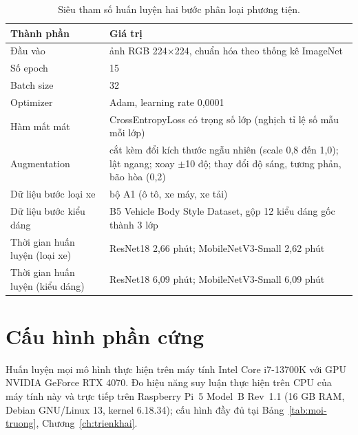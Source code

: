 \begin{table}[htbp]
\centering
\caption{Siêu tham số huấn luyện hai bước phân loại phương tiện.}
\label{tab:app-cls}

\vspace{4pt}
\begin{tabular}{@{}p{4.5cm}p{9cm}@{}}
\toprule
\textbf{Thành phần} & \textbf{Giá trị} \\
\midrule
Đầu vào & ảnh RGB 224$\times$224, chuẩn hóa theo thống kê ImageNet \\
Số epoch & 15 \\
Batch size & 32 \\
Optimizer & Adam, learning rate 0,0001 \\
Hàm mất mát & CrossEntropyLoss có trọng số lớp (nghịch tỉ lệ số mẫu mỗi lớp) \\
Augmentation & cắt kèm đổi kích thước ngẫu nhiên (scale 0,8 đến 1,0); lật ngang; xoay $\pm$10 độ; thay đổi độ sáng, tương phản, bão hòa (0,2) \\
Dữ liệu bước loại xe & bộ A1 (ô tô, xe máy, xe tải) \\
Dữ liệu bước kiểu dáng & B5 Vehicle Body Style Dataset, gộp 12 kiểu dáng gốc thành 3 lớp \\
Thời gian huấn luyện (loại xe) & ResNet18 2,66 phút; MobileNetV3-Small 2,62 phút \\
Thời gian huấn luyện (kiểu dáng) & ResNet18 6,09 phút; MobileNetV3-Small 6,09 phút \\
\bottomrule
\end{tabular}
\end{table}

\section{Cấu hình phần cứng}

Huấn luyện mọi mô hình thực hiện trên máy tính Intel Core i7-13700K với GPU NVIDIA GeForce RTX 4070. Đo hiệu năng suy luận thực hiện trên CPU của máy tính này và trực tiếp trên Raspberry Pi~5 Model~B Rev~1.1 (16 GB RAM, Debian GNU/Linux 13, kernel 6.18.34); cấu hình đầy đủ tại Bảng~\ref{tab:moi-truong}, Chương~\ref{ch:trienkhai}.
